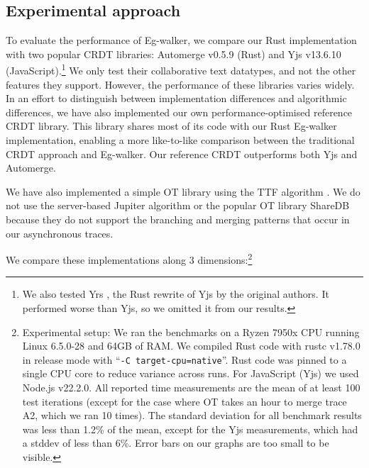 \documentclass[sigplan,10pt]{acmart}
\newcommand{\algname}{Eg-walker\xspace}
\begin{document}
\subsection{Experimental approach}

To evaluate the performance of \algname, we compare our Rust implementation with two popular CRDT libraries: Automerge v0.5.9 \cite{automerge} (Rust) and Yjs v13.6.10 \cite{yjs} (JavaScript).\footnote{We also tested Yrs \cite{yrs}, the Rust rewrite of Yjs by the original authors. It performed worse than Yjs, so we omitted it from our results.}
We only test their collaborative text datatypes, and not the other features they support.
However, the performance of these libraries varies widely.
In an effort to distinguish between implementation differences and algorithmic differences, we have also implemented our own performance-optimised reference CRDT library.
This library shares most of its code with our Rust \algname implementation, enabling a more like-to-like comparison between the traditional CRDT approach and \algname.
Our reference CRDT outperforms both Yjs and Automerge.

We have also implemented a simple OT library using the TTF algorithm \cite{Oster2006TTF}.
We do not use the server-based Jupiter algorithm \cite{Nichols1995} or the popular OT library ShareDB \cite{sharedb} because they do not support the branching and merging patterns that occur in our asynchronous traces.

We compare these implementations along 3 dimensions:\footnote{Experimental setup: We ran the benchmarks on a Ryzen 7950x CPU running Linux 6.5.0-28 and 64GB of RAM.
We compiled Rust code with rustc v1.78.0 in release mode with ``\texttt{-C target-cpu=native}''. Rust code was pinned to a single CPU core to reduce variance across runs. %
For JavaScript (Yjs) we used Node.js v22.2.0. %
All reported time measurements are the mean of at least 100 test iterations (except for the case where OT takes an hour to merge trace A2, which we ran 10 times).
The standard deviation for all benchmark results was less than 1.2\% of the mean, except for the Yjs measurements, which had a stddev of less than 6\%. Error bars on our graphs are too small to be visible.}
\end{document}
